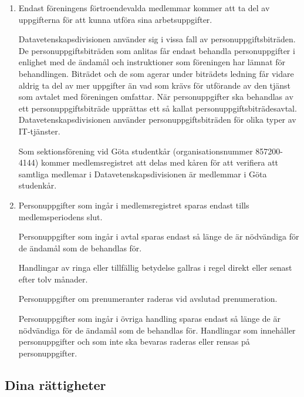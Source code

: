\documentclass{dvd}
\begin{document}
\begin{enumerate}[label=\arabic* \S, ref=\arabic*]
        \item Endast föreningens förtroendevalda medlemmar kommer att ta del av uppgifterna för att kunna utföra sina arbetsuppgifter.

		Datavetenskapsdivisionen använder sig i vissa fall av personuppgiftsbiträden.
		De personuppgiftsbiträden som anlitas får endast behandla personuppgifter i enlighet med de ändamål och instruktioner som föreningen har lämnat för behandlingen.
		Biträdet och de som agerar under biträdets ledning får vidare aldrig ta del av mer uppgifter än vad som krävs för utförande av den tjänst som avtalet med föreningen omfattar.
		När personuppgifter ska behandlas av ett personuppgiftsbiträde upprättas ett så kallat personuppgiftsbiträdesavtal.
		Datavetenskapsdivisionen använder personuppgiftsbiträden för olika typer av IT-tjänster.

		Som sektionsförening vid Göta studentkår (organisationsnummer 857200-4144) kommer medlemsregistret att delas med kåren för att verifiera att samtliga medlemar i Datavetenskapsdivisionen är medlemmar i Göta studenkår.

        \item Personuppgifter som ingår i medlemsregistret sparas endast tills medlemsperiodens slut.

		Personuppgifter som ingår i avtal sparas endast så länge de är nödvändiga för de ändamål som de behandlas för.

		Handlingar av ringa eller tillfällig betydelse gallras i regel direkt eller senast efter tolv månader.

		Personuppgifter om prenumeranter raderas vid avslutad prenumeration.

		Personuppgifter som ingår i övriga handling sparas endast så länge de är nödvändiga för de ändamål som de behandlas för.
		Handlingar som innehåller personuppgifter och som inte ska bevaras raderas eller rensas på personuppgifter.

    \end{enumerate}

    \subsection{Dina rättigheter}
\end{document}
